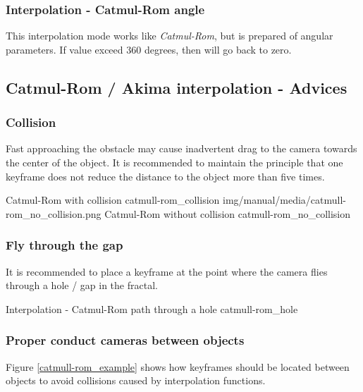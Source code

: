 \subsubsection{Interpolation - Catmul-Rom
	angle}\label{interpolation-catmul-rom-angle}

This interpolation mode works like \emph{Catmul-Rom}, but is prepared of angular
parameters. If value exceed 360 degrees, then will go back to zero.

\subsection{Catmul-Rom / Akima interpolation -
	Advices}\label{catmul-rom-akima-interpolation---advices}

\subsubsection{Collision}\label{collision}

Fast approaching the obstacle may cause inadvertent drag to the camera towards
the center of the object. It is recommended to maintain the principle that one
keyframe does not reduce the distance to the object more than five times.

{Catmul-Rom with collision}
{catmull-rom_collision}
{img/manual/media/catmull-rom_no_collision.png}
{Catmul-Rom without collision}
{catmull-rom_no_collision}

\subsubsection{Fly through the gap}\label{fly-through-the-gap}

It is recommended to place a keyframe at the point where the camera flies
through a hole / gap in the fractal.

{Interpolation - Catmul-Rom path through a hole}
{catmull-rom_hole}

\subsubsection{Proper conduct cameras between
	objects}\label{proper-conduct-cameras-between-objects}

Figure \ref{catmull-rom_example} shows how keyframes should be located between objects to avoid collisions caused by interpolation functions.

